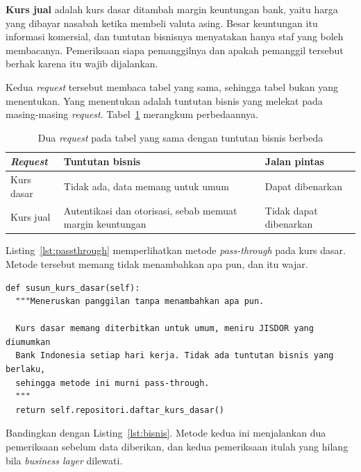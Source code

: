 \textbf{Kurs jual} adalah kurs dasar ditambah margin keuntungan bank, yaitu
harga yang dibayar nasabah ketika membeli valuta asing. Besar keuntungan itu
informasi komersial, dan tuntutan bisnisnya menyatakan hanya staf yang boleh
membacanya. Pemeriksaan siapa pemanggilnya dan apakah pemanggil tersebut berhak
karena itu wajib dijalankan.

Kedua \textit{request} tersebut membaca tabel yang sama, sehingga tabel bukan yang
menentukan. Yang menentukan adalah tuntutan bisnis yang melekat pada masing-masing
\textit{request}. Tabel~\ref{tab:dua-request} merangkum perbedaannya.

\begin{table}[htbp]
  \centering
  \caption{Dua \textit{request} pada tabel yang sama dengan tuntutan bisnis berbeda}
  \label{tab:dua-request}
  \begin{tabularx}{\textwidth}{|l|X|X|}
    \hline
    \textbf{\textit{Request}} & \textbf{Tuntutan bisnis} & \textbf{Jalan pintas} \\
    \hline
    Kurs dasar & Tidak ada, data memang untuk umum & Dapat dibenarkan \\
    \hline
    Kurs jual & Autentikasi dan otorisasi, sebab memuat margin keuntungan & Tidak dapat dibenarkan \\
    \hline
  \end{tabularx}
\end{table}

Listing~\ref{lst:passthrough} memperlihatkan metode \textit{pass-through} pada
kurs dasar. Metode tersebut memang tidak menambahkan apa pun, dan itu
wajar.

\begin{lstlisting}[style=PythonStyle, caption={Metode \textit{pass-through}
  yang wajar pada kelas LayananKurs, tersedia di
  \berkas{sources/chapter02/aplikasi_tertutup.py}}, label=lst:passthrough]
def susun_kurs_dasar(self):
  """Meneruskan panggilan tanpa menambahkan apa pun.

  Kurs dasar memang diterbitkan untuk umum, meniru JISDOR yang diumumkan
  Bank Indonesia setiap hari kerja. Tidak ada tuntutan bisnis yang berlaku,
  sehingga metode ini murni pass-through.
  """
  return self.repositori.daftar_kurs_dasar()
\end{lstlisting}

Bandingkan dengan Listing~\ref{lst:bisnis}. Metode kedua ini menjalankan dua
pemeriksaan sebelum data diberikan, dan kedua pemeriksaan itulah yang hilang
bila \textit{business layer} dilewati.

